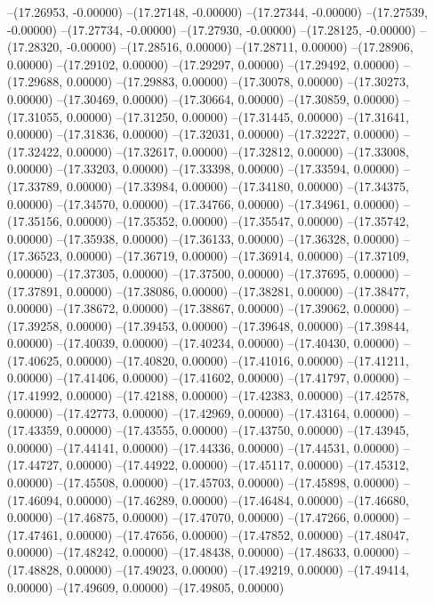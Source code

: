 --(17.26953, -0.00000)
--(17.27148, -0.00000)
--(17.27344, -0.00000)
--(17.27539, -0.00000)
--(17.27734, -0.00000)
--(17.27930, -0.00000)
--(17.28125, -0.00000)
--(17.28320, -0.00000)
--(17.28516, 0.00000)
--(17.28711, 0.00000)
--(17.28906, 0.00000)
--(17.29102, 0.00000)
--(17.29297, 0.00000)
--(17.29492, 0.00000)
--(17.29688, 0.00000)
--(17.29883, 0.00000)
--(17.30078, 0.00000)
--(17.30273, 0.00000)
--(17.30469, 0.00000)
--(17.30664, 0.00000)
--(17.30859, 0.00000)
--(17.31055, 0.00000)
--(17.31250, 0.00000)
--(17.31445, 0.00000)
--(17.31641, 0.00000)
--(17.31836, 0.00000)
--(17.32031, 0.00000)
--(17.32227, 0.00000)
--(17.32422, 0.00000)
--(17.32617, 0.00000)
--(17.32812, 0.00000)
--(17.33008, 0.00000)
--(17.33203, 0.00000)
--(17.33398, 0.00000)
--(17.33594, 0.00000)
--(17.33789, 0.00000)
--(17.33984, 0.00000)
--(17.34180, 0.00000)
--(17.34375, 0.00000)
--(17.34570, 0.00000)
--(17.34766, 0.00000)
--(17.34961, 0.00000)
--(17.35156, 0.00000)
--(17.35352, 0.00000)
--(17.35547, 0.00000)
--(17.35742, 0.00000)
--(17.35938, 0.00000)
--(17.36133, 0.00000)
--(17.36328, 0.00000)
--(17.36523, 0.00000)
--(17.36719, 0.00000)
--(17.36914, 0.00000)
--(17.37109, 0.00000)
--(17.37305, 0.00000)
--(17.37500, 0.00000)
--(17.37695, 0.00000)
--(17.37891, 0.00000)
--(17.38086, 0.00000)
--(17.38281, 0.00000)
--(17.38477, 0.00000)
--(17.38672, 0.00000)
--(17.38867, 0.00000)
--(17.39062, 0.00000)
--(17.39258, 0.00000)
--(17.39453, 0.00000)
--(17.39648, 0.00000)
--(17.39844, 0.00000)
--(17.40039, 0.00000)
--(17.40234, 0.00000)
--(17.40430, 0.00000)
--(17.40625, 0.00000)
--(17.40820, 0.00000)
--(17.41016, 0.00000)
--(17.41211, 0.00000)
--(17.41406, 0.00000)
--(17.41602, 0.00000)
--(17.41797, 0.00000)
--(17.41992, 0.00000)
--(17.42188, 0.00000)
--(17.42383, 0.00000)
--(17.42578, 0.00000)
--(17.42773, 0.00000)
--(17.42969, 0.00000)
--(17.43164, 0.00000)
--(17.43359, 0.00000)
--(17.43555, 0.00000)
--(17.43750, 0.00000)
--(17.43945, 0.00000)
--(17.44141, 0.00000)
--(17.44336, 0.00000)
--(17.44531, 0.00000)
--(17.44727, 0.00000)
--(17.44922, 0.00000)
--(17.45117, 0.00000)
--(17.45312, 0.00000)
--(17.45508, 0.00000)
--(17.45703, 0.00000)
--(17.45898, 0.00000)
--(17.46094, 0.00000)
--(17.46289, 0.00000)
--(17.46484, 0.00000)
--(17.46680, 0.00000)
--(17.46875, 0.00000)
--(17.47070, 0.00000)
--(17.47266, 0.00000)
--(17.47461, 0.00000)
--(17.47656, 0.00000)
--(17.47852, 0.00000)
--(17.48047, 0.00000)
--(17.48242, 0.00000)
--(17.48438, 0.00000)
--(17.48633, 0.00000)
--(17.48828, 0.00000)
--(17.49023, 0.00000)
--(17.49219, 0.00000)
--(17.49414, 0.00000)
--(17.49609, 0.00000)
--(17.49805, 0.00000)
